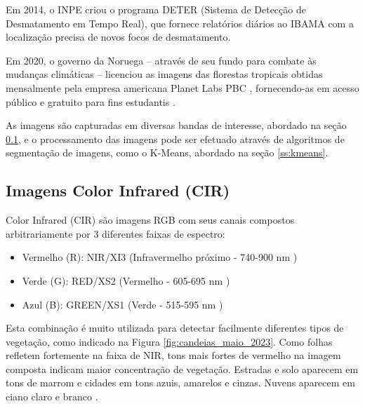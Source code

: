 \documentclass[11pt]{article}
\begin{document}



Em 2014, o INPE criou o programa DETER (Sistema de Detecção de Desmatamento em Tempo Real), que fornece relatórios diários ao IBAMA com a localização precisa de novos focos de desmatamento.

Em 2020, o governo da Noruega -- através de seu fundo para combate às mudanças climáticas -- licenciou as imagens das florestas tropicais obtidas mensalmente pela empresa americana Planet Labs PBC \cite{noruega:2020}, fornecendo-as em acesso público e gratuito para fins estudantis \cite{planet:2020}.

As imagens são capturadas em diversas bandas de interesse, abordado na seção \ref{ss:cir}, e o processamento das imagens pode ser efetuado através de algoritmos de segmentação de imagens, como o K-Means, abordado na seção \ref{ss:kmeans}.


\subsection{Imagens Color Infrared (CIR)}
\label{ss:cir}

Color Infrared (CIR) são imagens RGB com seus canais compostos arbitrariamente por 3 diferentes faixas de espectro:

\begin{itemize}
	\item Vermelho (R): NIR/XI3 (Infravermelho próximo - 740-900 nm \cite{skysat:2022})
	\item Verde (G): RED/XS2 (Vermelho - 605-695 nm \cite{skysat:2022})
	\item Azul (B): GREEN/XS1 (Verde - 515-595 nm \cite{skysat:2022})
\end{itemize}

Esta combinação é muito utilizada para detectar facilmente diferentes tipos de vegetação, como indicado na Figura \ref{fig:candeias_maio_2023}. Como folhas refletem fortemente na faixa de NIR, tons mais fortes de vermelho na imagem composta indicam maior concentração de vegetação. Estradas e solo aparecem em tons de marrom e cidades em tons azuis, amarelos e cinzas. Nuvens aparecem em ciano claro e branco \cite{eos:cir:2023}.
\end{document}

